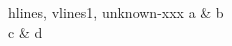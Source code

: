 \documentclass{article}
\begin{document}
\START

  \begin{tblr}{hlines, vlines{1}, unknown-xxx}
    a & b \\
    c & d
  \end{tblr}
\ENDTEST
\end{document}
